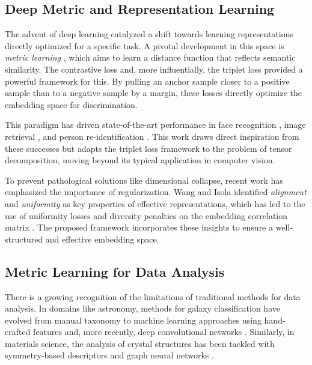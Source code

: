 \documentclass[a4paper,12pt,reqno]{amsart}
\theoremstyle{definition}
\theoremstyle{remark}
\begin{document}
\subsection*{Deep Metric and Representation Learning}

The advent of deep learning catalyzed a shift towards learning representations directly optimized for a specific task. A pivotal development in this space is \textit{metric learning} \cite{kulis2013metric}, which aims to learn a distance function that reflects semantic similarity. The contrastive loss \cite{hadsell2006dimensionality} and, more influentially, the triplet loss \cite{schroff2015facenet} provided a powerful framework for this. By pulling an anchor sample closer to a positive sample than to a negative sample by a margin, these losses directly optimize the embedding space for discrimination.

This paradigm has driven state-of-the-art performance in face recognition \cite{wang2018cosface}, image retrieval \cite{faghri2018vse}, and person re-identification \cite{hermans2017defense}. This work draws direct inspiration from these successes but adapts the triplet loss framework to the problem of tensor decomposition, moving beyond its typical application in computer vision.

To prevent pathological solutions like dimensional collapse, recent work has emphasized the importance of regularization. Wang and Isola \cite{wang2020understanding} identified \textit{alignment} and \textit{uniformity} as key properties of effective representations, which has led to the use of uniformity losses and diversity penalties on the embedding correlation matrix \cite{kulkarni2019canonical}. The proposed framework incorporates these insights to ensure a well-structured and effective embedding space.

\subsection*{Metric Learning for Data Analysis}

There is a growing recognition of the limitations of traditional methods for data analysis. In domains like astronomy, methods for galaxy classification have evolved from manual taxonomy \cite{hubble1926extragalactic} to machine learning approaches using hand-crafted features \cite{dieleman2015rotation} and, more recently, deep convolutional networks \cite{walmsley2022galaxy}. Similarly, in materials science, the analysis of crystal structures has been tackled with symmetry-based descriptors \cite{isayev2017universality} and graph neural networks \cite{xie2018crystal}.
\end{document}
